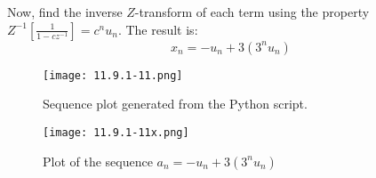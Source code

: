 \documentclass[12pt]{article}
\begin{document}
Now, find the inverse \(Z\)-transform of each term using the property \(Z^{-1}\left[\frac{1}{1-cz^{-1}}\right] = c^n u_n\). The result is:
\begin{equation}
x_n = -u_n + 3(3^n u_n)
\end{equation}

\begin{figure}[h]
    \centering
    \texttt{[image: 11.9.1-11.png]}
    \caption{Sequence plot generated from the Python script.}
    \label{fig:sequence-plot}
\end{figure}

\begin{figure}[h]
  \centering
  \texttt{[image: 11.9.1-11x.png]} %
  \caption{Plot of the sequence \(a_n = -u_n + 3(3^n u_n)\)}
  \label{fig:sequence_plot}
\end{figure}
\end{document}
